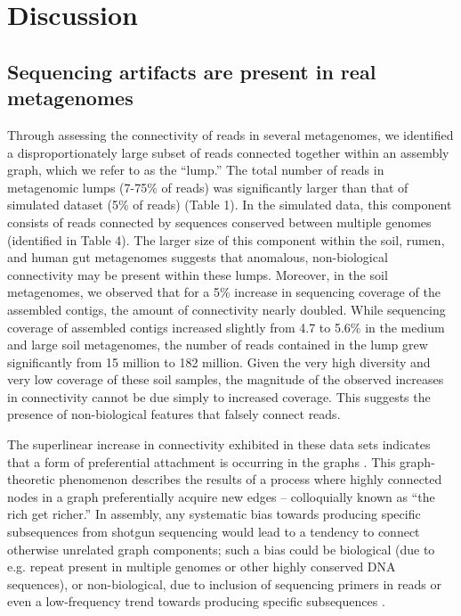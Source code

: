 \documentclass[10pt]{article}
\begin{document}
\section*{Discussion}

\subsection*{Sequencing artifacts are present in real metagenomes}

Through assessing the connectivity of reads in several metagenomes, we
identified a disproportionately large subset of reads
connected together within an assembly graph, which we refer to as
the ``lump.''
The total number of reads in
metagenomic lumps (7-75\% of reads) was significantly larger than that
of simulated dataset (5\% of reads) (Table 1).  In the simulated data,
this component consists
of reads connected by
sequences conserved between multiple genomes
(identified in Table 4).  The larger size of this component
within the soil, rumen, and human gut metagenomes
suggests that anomalous, non-biological connectivity may be present
within these lumps.  Moreover, in the soil metagenomes, we
observed that for a 5\% increase in sequencing coverage of the assembled
contigs, the amount of connectivity nearly doubled.
While sequencing coverage of assembled contigs
increased slightly from 4.7 to 5.6\% in the medium and large soil
metagenomes, the number of reads contained in the lump grew
significantly from 15 million to 182 million.  Given the very high
diversity and very low coverage of these soil samples, the magnitude of the
observed increases in connectivity cannot be due simply to increased
coverage.  This suggests the presence of non-biological features
that falsely connect reads.

The superlinear increase in connectivity exhibited in these data sets
indicates that a form of preferential attachment is occurring in the
graphs \cite{Barabasi:1999p1083}.  This graph-theoretic phenomenon
describes the results of a process where highly connected nodes in a
graph preferentially acquire new edges -- colloquially known as ``the
rich get richer.''  In assembly, any systematic bias towards producing
specific subsequences from shotgun sequencing would lead to a tendency
to connect otherwise unrelated graph components; such a bias could be
biological (due to e.g. repeat present in multiple genomes or other
highly conserved DNA sequences), or non-biological, due to inclusion
of sequencing primers in reads or even a low-frequency trend towards
producing specific subsequences \cite{Hansen:2010if,Minoche:2011fl,Dohm:2008ky}.
\end{document}
